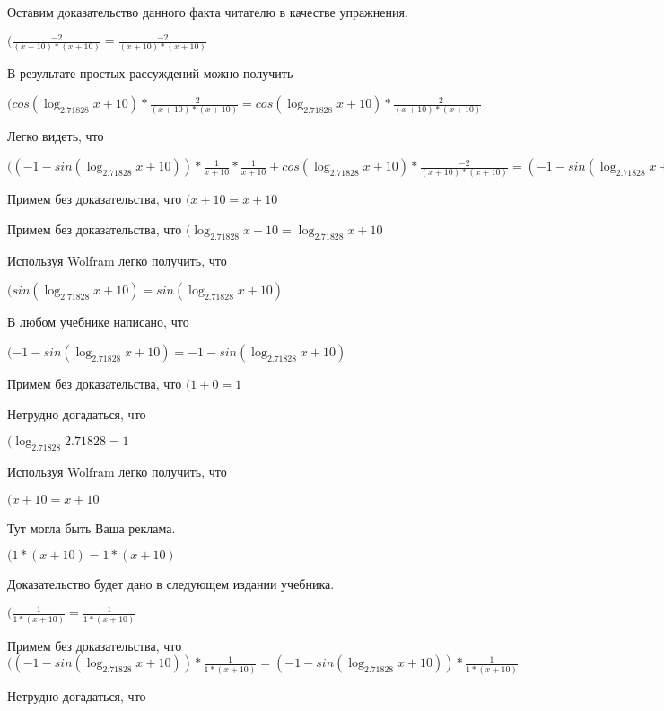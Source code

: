 \documentclass[12pt,a4paper,fleqn]{article}
\theoremstyle{definition}
\begin{document}
Оставим доказательство данного факта читателю в качестве упражнения.

$(\frac{ -2 }{( x  +  10 ) * ( x  +  10 )}
 = \frac{ -2 }{( x  +  10 ) * ( x  +  10 )}
$

В результате простых рассуждений можно получить

$(cos(\log_{ 2.71828 }{ x  +  10 }) * \frac{ -2 }{( x  +  10 ) * ( x  +  10 )}
 = cos(\log_{ 2.71828 }{ x  +  10 }) * \frac{ -2 }{( x  +  10 ) * ( x  +  10 )}
$

Легко видеть, что

$(( -1  - sin(\log_{ 2.71828 }{ x  +  10 })) * \frac{ 1 }{ x  +  10 }
 * \frac{ 1 }{ x  +  10 }
 + cos(\log_{ 2.71828 }{ x  +  10 }) * \frac{ -2 }{( x  +  10 ) * ( x  +  10 )}
 = ( -1  - sin(\log_{ 2.71828 }{ x  +  10 })) * \frac{ 1 }{ x  +  10 }
 * \frac{ 1 }{ x  +  10 }
 + cos(\log_{ 2.71828 }{ x  +  10 }) * \frac{ -2 }{( x  +  10 ) * ( x  +  10 )}
$

Примем без доказательства, что
$( x  +  10  =  x  +  10 $

Примем без доказательства, что
$(\log_{ 2.71828 }{ x  +  10 } = \log_{ 2.71828 }{ x  +  10 }$

Используя Wolfram легко получить, что

$(sin(\log_{ 2.71828 }{ x  +  10 }) = sin(\log_{ 2.71828 }{ x  +  10 })$

В любом учебнике написано, что

$( -1  - sin(\log_{ 2.71828 }{ x  +  10 }) =  -1  - sin(\log_{ 2.71828 }{ x  +  10 })$

Примем без доказательства, что
$( 1  +  0  =  1 $

Нетрудно догадаться, что

$(\log_{ 2.71828 }{ 2.71828 } =  1 $

Используя Wolfram легко получить, что

$( x  +  10  =  x  +  10 $

Тут могла быть Ваша реклама.

$( 1  * ( x  +  10 ) =  1  * ( x  +  10 )$

Доказательство будет дано в следующем издании учебника.

$(\frac{ 1 }{ 1  * ( x  +  10 )}
 = \frac{ 1 }{ 1  * ( x  +  10 )}
$

Примем без доказательства, что
$(( -1  - sin(\log_{ 2.71828 }{ x  +  10 })) * \frac{ 1 }{ 1  * ( x  +  10 )}
 = ( -1  - sin(\log_{ 2.71828 }{ x  +  10 })) * \frac{ 1 }{ 1  * ( x  +  10 )}
$

Нетрудно догадаться, что
\end{document}
